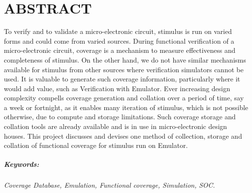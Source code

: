 \chapter*{ABSTRACT}

To verify and to validate a micro-electronic circuit, stimulus is run on varied forms and could come from varied sources. During functional verification of a micro-electronic circuit, coverage is a mechanism to measure effectiveness and completeness of stimulus. On the other hand, we do not have similar mechanisms available for stimulus from other sources where verification simulators cannot be used. It is valuable to generate such coverage information, particularly where it would add value, such as Verification with Emulator. Ever increasing design complexity compells coverage generation and collation over a period of time, say a week or fortnight, as it enables many iteration of stimulus, which is not possible otherwise, due to compute and storage limitations. Such coverage storage and collation tools are already available and is in use in micro-electronic design houses. This project discusses and devises one method of collection, storage and collation of functional coverage for stimulus run on Emulator.



\paragraph{Keywords:}
 \emph{Coverage Database, Emulation, Functional coverage, Simulation, SOC.}
